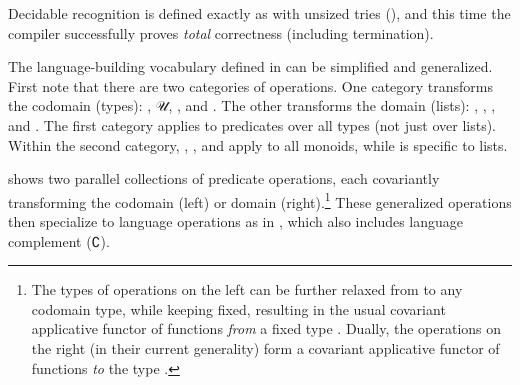 \documentclass[acmsmall,screen,anonymous,timestamp]{acmart}
\begin{document}
Decidable recognition is defined exactly as with unsized tries (), and this time the compiler successfully proves \emph{total} correctness (including termination).


\rnc{}

The language-building vocabulary defined in  can be simplified and generalized.
First note that there are two categories of operations.
One category transforms the codomain (types): , \AF 𝒰, , and .
The other transforms the domain (lists): , , , and .
The first category applies to predicates over all types (not just over lists).
Within the second category, , , and  apply to all monoids, while  is specific to lists.

 shows two parallel collections of predicate operations, each covariantly transforming the codomain (left) or domain (right).\footnote{The types of operations on the left can be further relaxed from  to any codomain type, while keeping  fixed, resulting in the usual covariant applicative functor of functions \emph{from} a fixed type \citep{McBride2008APE}.
Dually, the operations on the right (in their current generality) form a covariant applicative functor of functions \emph{to} the type .}
These generalized operations then specialize to language operations as in , which also includes language complement (\AF ∁).
\end{document}
